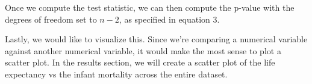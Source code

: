 \documentclass[a4paper, twocolumn]{article}
\begin{document}
Once we compute the test statistic, we can then compute the p-value with the degrees of freedom set to $n-2$,
as specified in equation 3.

Lastly, we would like to visualize this. Since we're comparing a numerical variable against another numerical 
variable, it would make the most sense to plot a scatter plot. In the results section, we will create a scatter plot
of the life expectancy vs the infant mortality across the entire dataset. 
\end{document}
